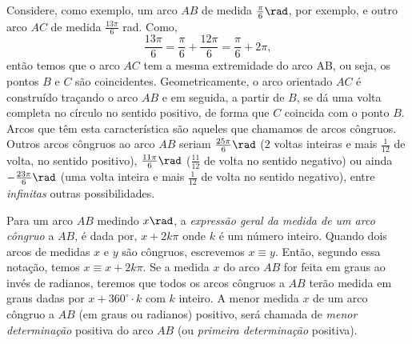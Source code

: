 Considere, como exemplo, um arco $AB$ de medida $\frac{\pi}{6} \rad$, por exemplo, e outro arco $AC$ de medida $\frac{13\pi}{6}$ rad. Como, 
\begin{equation*}
\frac{13\pi}{6}=\frac{\pi}{6}+\frac{12\pi}{6}=\frac{\pi}{6}+2\pi,
\end{equation*}
então temos que o arco $AC$ tem a mesma extremidade do arco AB, ou seja, os pontos $B$ e $C$ são coincidentes. Geometricamente, o arco orientado $AC$ é construído traçando o arco $AB$ e em seguida, a partir de $B$, se dá uma volta completa no círculo no sentido positivo, de forma que $C$ coincida com o ponto $B$. Arcos que têm esta característica são aqueles que chamamos de arcos côngruos. Outros arcos côngruos ao arco $AB$ seriam $\frac{25\pi}{6} \rad$ ($2$ voltas inteiras e mais  $\frac{1}{12}$ de volta, no sentido positivo), $\frac{11\pi}{6}\rad$ ($\frac{11}{12}$ de volta no sentido negativo) ou ainda $-\frac{23\pi}{6}\rad$ (uma volta inteira e mais $\frac{1}{12}$ de volta no sentido negativo), entre \textit{infinitas} outras possibilidades.

Para um arco $AB$ medindo $x\rad$, a \textit{expressão geral da medida de um arco côngruo} a $AB$, é dada por, $x+2k\pi$ onde $k$ é um número inteiro. Quando dois arcos de medidas $x$ e $y$ são côngruos, escrevemos $x\equiv y$. Então, segundo essa notação, temos $x\equiv x+2k\pi$. Se a medida $x$ do arco $AB$ for feita em graus ao invés de radianos, teremos que todos os arcos côngruos a $AB$ terão medida em graus dadas por $x+360^{\circ}\cdot k$ com $k$ inteiro. A menor medida $x$ de um arco côngruo a $AB$ (em graus ou radianos) positivo, será chamada de \textit{menor determinação} positiva do arco $AB$ (ou \textit{primeira determinação }positiva).


\label{trig-prac2}

